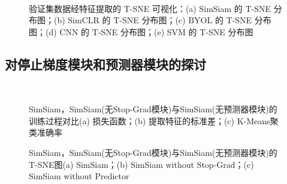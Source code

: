 \documentclass[master]{thesis-uestc}
\begin{document}
\begin{figure}
    \centering
    \\
    \caption{验证集数据经特征提取的 T-SNE 可视化：(a) SimSiam 的 T-SNE 分布图；(b) SimCLR 的 T-SNE 分布图；(c) BYOL 的 T-SNE 分布图；(d) CNN 的 T-SNE 分布图；(e) SVM 的 T-SNE 分布图}
    \label{tsne_of_all_models}
\end{figure}

\subsection{对停止梯度模块和预测器模块的探讨}
\label{sec:discuss_of_simsiam_module}

\begin{figure}
    \centering
    \\
    \caption{SimSiam，SimSiam(无Stop-Grad模块)与SimSiam(无预测器模块)的训练过程对比(a) 损失函数；(b) 提取特征的标准差；(c) K-Means聚类准确率}
    \label{train_process_simsiam_discuss}
\end{figure}

\begin{figure}
    \centering
    \caption{SimSiam，SimSiam(无Stop-Grad模块)与SimSiam(无预测器模块)的T-SNE图(a) SimSiam；(b) SimSiam without Stop-Grad；(c) SimSiam without Predictor}
    \label{tsne_simsiam_discuss}
\end{figure}
\end{document}
